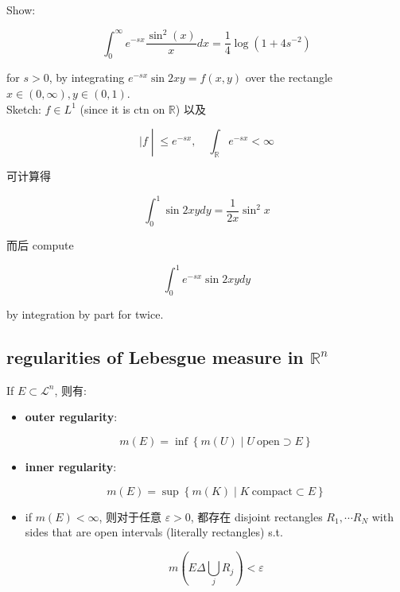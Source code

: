 \begin{example}

Show:

\[\int_{0}^{\infty}e^{- sx}\frac{\sin^{2}(x)}{x} dx = \frac{1}{4}\log(1 + 4s^{- 2})\]

for \(s > 0\), by integrating \(e^{- sx}\sin 2xy = f(x,y)\) over the rectangle \(x \in (0,\infty),y \in (0,1)\).\\
Sketch: \(f \in L^{1}\) (since it is ctn on \(\mathbb{R}\)) 以及

\[\left. |f \middle| \leq e^{- sx},\quad\int_{\mathbb{R}}e^{- sx} < \infty \right.\]

可计算得

\[\int_{0}^{1}\sin 2xy dy = \frac{1}{2x}\sin^{2}x\]

而后 compute

\[\int_{0}^{1}e^{- sx}\sin 2xy dy\]

by integration by part for twice.

\end{example}

\subsection{\texorpdfstring{regularities of Lebesgue measure in \(\mathbb{R}^{n}\)}{regularities of Lebesgue measure in \textbackslash mathbb\{R\}\^{}\{n\}}}\label{regularities-of-lebesgue-measure-in-mathbbrn}

\begin{theorem}{}

If \(E \subset \mathcal{L}^{n}\), 则有:

\begin{itemize}
\item
  \textbf{outer regularity}:

  \[m(E) = \inf\left\{ {m(U) \mid U\ \text{open} \supset E} \right\}\]
\item
  \textbf{inner regularity}:

  \[m(E) = \sup\left\{ {m(K) \mid K\ \text{compact} \subset E} \right\}\]
\item
  if \(m(E) < \infty\), 则对于任意 \(\varepsilon > 0\), 都存在 disjoint rectangles \(R_{1},\cdots R_{N}\) with sides that are open intervals (literally rectangles) s.t.

  \[m(E\Delta\bigcup\limits_{j}R_{j}) < \varepsilon\]
\end{itemize}

\end{theorem}

